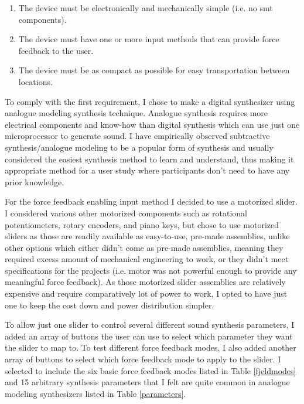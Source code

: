 \begin{enumerate}
	\item The device must be electronically and mechanically simple (i.e. no \gls{smt} components).
	\item The device must have one or more input methods that can provide force feedback to the user.
	\item The device must be as compact as possible for easy transportation between locations.
\end{enumerate}

To comply with the first requirement, I chose to make a digital synthesizer using analogue modeling synthesis technique. Analogue synthesis requires more electrical components and know-how than digital synthesis which can use just one microprocessor to generate sound. I have empirically observed subtractive synthesis/analogue modeling to be a popular form of synthesis and usually considered the easiest synthesis method to learn and understand, thus making it appropriate method for a user study where participants don't need to have any prior knowledge.

For the force feedback enabling input method I decided to use a motorized slider. I considered various other motorized components such as rotational potentiometers, rotary encoders, and piano keys, but chose to use motorized sliders as those are readily available as easy-to-use, pre-made assemblies, unlike other options which either didn't come as pre-made assemblies, meaning they required excess amount of mechanical engineering to work, or they didn't meet specifications for the projects (i.e. motor was not powerful enough to provide any meaningful force feedback). As those motorized slider assemblies are relatively expensive and require comparatively lot of power to work, I opted to have just one to keep the cost down and power distribution simpler.

To allow just one slider to control several different sound synthesis parameters, I added an array of buttons the user can use to select which parameter they want the slider to map to. To test different force feedback modes, I also added another array of buttons to select which force feedback mode to apply to the slider. I selected to include the six basic force feedback modes listed in Table \ref{fjeldmodes} and 15 arbitrary synthesis parameters that I felt are quite common in analogue modeling synthesizers listed in Table \ref{parameters}.

